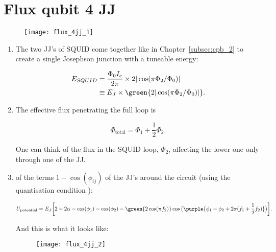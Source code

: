 \section{Flux qubit 4 JJ \cite{mooij1999}}

\begin{figure}[h]
  \centering%
  \texttt{[image: flux\_4jj\_1]}
\end{figure}

\begin{enumerate}
\item   The    two   JJ's    of   SQUID    come   together    like   in
  Chapter~\ref{subsec:cpb_2} to create a single Josephson junction with
  a tuneable energy:

  \begin{equation}
    \begin{aligned}
      E_{SQUID} & = \frac{\Phi_0I_c}{2\pi}\times 2|\cos(\pi\Phi_\text{2}/\Phi_0)|\\
      & \equiv E_J \times \green{2|\cos(\pi\Phi_\text{2}/\Phi_0)|}.
    \end{aligned}
  \end{equation}

\item The effective flux penetrating the full loop is

  \begin{equation}
    \Phi_\text{total} = \Phi_1 + \frac{1}{2}\Phi_2.
  \end{equation}

  \noindent One can  think of the flux  in the SQUID loop,  $ \Phi_2 $,
  affecting the lower one only through one of the JJ.

\item    {}   of    the    terms
  $ 1  - \cos(\phi_{ij}) $  of the JJ's  around the circuit  (using the
  quantisation                                                condition
  ):

  \begin{equation}
    U_\text{potential} = E_J \bigg[2 + 2\alpha - \cos(\phi_1) - \cos(\phi_2) - \green{2\cos(\pi f_2)}\cos\big(\purple{\phi_1 - \phi_2 + 2\pi(f_1+\frac{1}{2}f_2)}\big) \bigg].
  \end{equation}

  \noindent And this is what it looks like:
  \begin{figure}[h]
    \centering \texttt{[image: flux\_4jj\_2]}
  \end{figure}


\end{enumerate}
